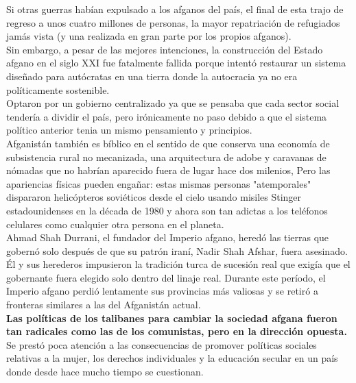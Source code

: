 \documentclass[10pt]{book}
\begin{document}
 Si otras guerras habían expulsado a los afganos del país, el final de esta trajo de regreso a unos cuatro millones de personas, la mayor repatriación de refugiados jamás vista (y una realizada en gran parte por los propios afganos).\\
  Sin embargo, a pesar de las mejores intenciones, la construcción del Estado afgano en el siglo XXI fue fatalmente fallida porque intentó restaurar un sistema diseñado para autócratas en una tierra donde la autocracia ya no era políticamente sostenible.\\
Optaron por un gobierno centralizado ya que se pensaba que cada sector social tendería a dividir el país, pero irónicamente no paso debido a que el sistema político anterior tenia un mismo pensamiento y principios.\\
Afganistán también es bíblico en el sentido de que conserva una economía de subsistencia rural no mecanizada, una arquitectura de adobe y caravanas de nómadas que no habrían aparecido fuera de lugar hace dos milenios, Pero las apariencias físicas pueden engañar: estas mismas personas "atemporales" dispararon helicópteros soviéticos desde el cielo usando misiles Stinger estadounidenses en la década de 1980 y ahora son tan adictas a los teléfonos celulares como cualquier otra persona en el planeta.\\
Ahmad Shah Durrani, el fundador del Imperio afgano, heredó las tierras que gobernó solo después de que su patrón iraní, Nadir Shah Afshar, fuera asesinado. Él y sus herederos impusieron la tradición turca de sucesión real que exigía que el gobernante fuera elegido solo dentro del linaje real. Durante este período, el Imperio afgano perdió lentamente sus provincias más valiosas y se retiró a fronteras similares a las del Afganistán actual.\\
\textbf{Las políticas de los talibanes para cambiar la sociedad afgana fueron tan radicales como las de los comunistas, pero en la dirección opuesta. }\\
Se prestó poca atención a las consecuencias de promover políticas sociales relativas a la mujer, los derechos individuales y la educación secular en un país donde desde hace mucho tiempo se cuestionan.
\end{document}

